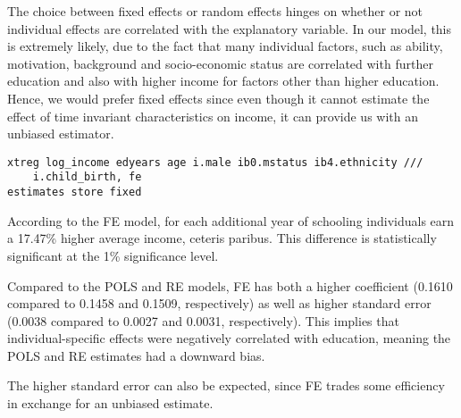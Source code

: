 


The choice between fixed effects or random effects hinges on whether or not individual effects are correlated with the explanatory variable. In our model, this is extremely likely, due to the fact that many individual factors, such as ability, motivation, background and socio-economic status are correlated with further education and also with higher income for factors other than higher education. Hence, we would prefer fixed effects since even though it cannot estimate the effect of time invariant characteristics on income, it can provide us with an unbiased estimator.


\begin{verbatim}
xtreg log_income edyears age i.male ib0.mstatus ib4.ethnicity ///
    i.child_birth, fe
estimates store fixed
\end{verbatim}


According to the FE model, for each additional year of schooling individuals earn a 17.47\% higher average income, ceteris paribus. This difference is statistically significant at the 1\% significance level.

Compared to the POLS and RE models, FE has both a higher coefficient (0.1610 compared to 0.1458 and 0.1509, respectively) as well as higher standard error (0.0038 compared to 0.0027 and 0.0031, respectively). This implies that individual-specific effects were negatively correlated with education, meaning the POLS and RE estimates had a downward bias.

The higher standard error can also be expected, since FE trades some efficiency in exchange for an unbiased estimate.

